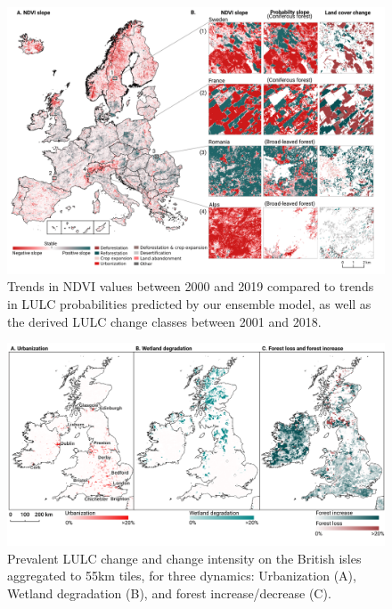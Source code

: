     \begin{landscape}
    \begin{figure}[!hp]
    \vspace*{-1.5cm}
        \hspace*{-3.5cm}
    \centering 
    \includegraphics[width=1.3\textwidth]{figs_03/results_ndvi_visual.png}
    \caption{Trends in NDVI values between 2000 and 2019 compared to trends in LULC probabilities predicted by our ensemble model, as well as the derived LULC change classes between 2001 and 2018.} \label{fig:ndvi_slope}
    \end{figure}
    \end{landscape}
    
    \begin{landscape}
    \begin{figure}[!hp] 
    \centering 
    \includegraphics[width=1.3\textwidth]{figs_03/results_prevalent_change.png}
    \caption{Prevalent LULC change and change intensity on the British isles aggregated to 5{\texttimes}5km tiles, for three dynamics: Urbanization (A), Wetland degradation (B), and forest increase/decrease (C).} \label{fig:prominent_change}
    \end{figure}
    \end{landscape}

